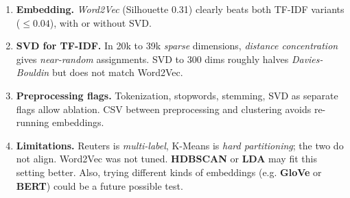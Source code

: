 \documentclass[twocolumn]{article}
\begin{document}
\begin{enumerate}
    \item \textbf{Embedding.} \textit{Word2Vec} (Silhouette 0.31) clearly beats both TF-IDF variants ($\leq 0.04$), with or without SVD.

    \item \textbf{SVD for TF-IDF.} In 20k to 39k \textit{sparse} dimensions, \textit{distance concentration} gives \textit{near-random} assignments. SVD to 300 dims roughly halves \textit{Davies-Bouldin} but does not match Word2Vec.

    \item \textbf{Preprocessing flags.} Tokenization, stopwords, stemming, SVD as separate flags allow ablation. CSV between preprocessing and clustering avoids re-running embeddings.

    \item \textbf{Limitations.} Reuters is \textit{multi-label}, K-Means is \textit{hard partitioning}; the two do not align. Word2Vec was not tuned. \textbf{HDBSCAN} or \textbf{LDA} may fit this setting better.
    Also, trying different kinds of embeddings (e.g. \textbf{GloVe} or \textbf{BERT}) could be a future possible test.
    
\end{enumerate}
\end{document}

